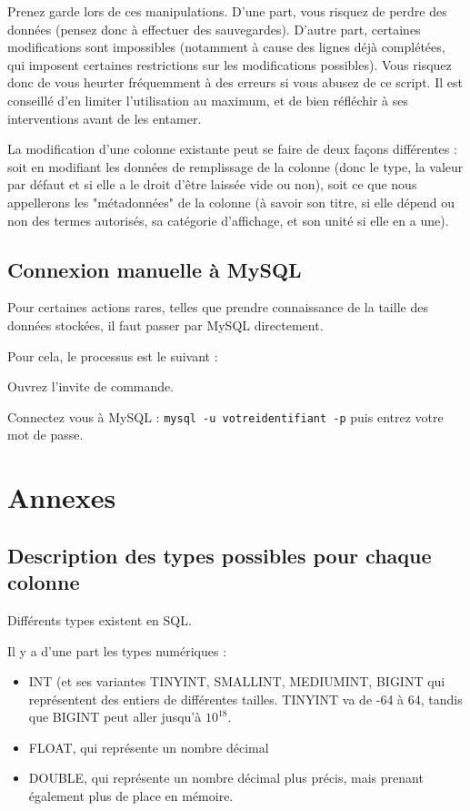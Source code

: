 \documentclass[12pt,a4paper]{article}
\begin{document}
            Prenez garde lors de ces manipulations. D'une part, vous risquez de perdre
            des données (pensez donc à effectuer des sauvegardes). D'autre part, certaines
            modifications sont impossibles (notamment à cause des lignes déjà complétées,
            qui imposent certaines restrictions sur les modifications possibles). Vous
            risquez donc de vous heurter fréquemment à des erreurs si vous abusez de ce script.
            Il est conseillé d'en limiter l'utilisation au maximum, et de bien réfléchir
            à ses interventions avant de les entamer.

            La modification d'une colonne existante peut se faire de deux façons différentes :
            soit en modifiant les données de remplissage de la colonne (donc le type, la valeur
            par défaut et si elle a le droit d'être laissée vide ou non), soit ce que nous
            appellerons les "métadonnées" de la colonne (à savoir son titre, si elle dépend
            ou non des termes autorisés, sa catégorie d'affichage, et son unité si elle
            en a une).


    \bigskip
    \subsection{Connexion manuelle à MySQL}\label{connexionmanuelle}
        Pour certaines actions rares, telles que prendre connaissance de la taille des
        données stockées, il faut passer par MySQL directement.

        Pour cela, le processus est le suivant : 

        Ouvrez l'invite de commande.

        Connectez vous à MySQL : \verb+mysql -u votreidentifiant -p+ puis entrez votre mot de passe.


\clearpage
\appendix
\section*{Annexes}
    
    \subsection{Description des types possibles pour chaque colonne}\label{types}
        Différents types existent en SQL.
        
        Il y a d'une part les types numériques :
        \begin{itemize}
            \item INT (et ses variantes TINYINT, SMALLINT, MEDIUMINT, BIGINT qui représentent
            des entiers de différentes tailles. TINYINT va de -64 à 64, 
            tandis que BIGINT peut aller jusqu'à $10^{18}$.
            \item FLOAT, qui représente un nombre décimal 
            \item DOUBLE, qui représente un nombre décimal plus précis,
            mais prenant également plus de place en mémoire.
        \end{itemize}
\end{document}
